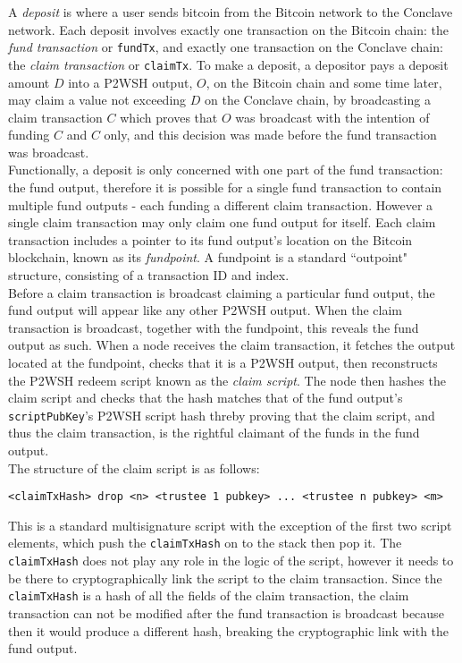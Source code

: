 \documentclass{article}
\begin{document}
A \textit{deposit} is where a user sends bitcoin from the Bitcoin network to the Conclave network. Each deposit involves exactly one transaction on the Bitcoin chain: the \textit{fund transaction} or \texttt{fundTx}, and exactly one transaction on the Conclave chain: the \textit{claim transaction} or \texttt{claimTx}. To make a deposit, a depositor pays a deposit amount $D$ into a P2WSH output, $O$, on the Bitcoin chain and some time later, may claim a value not exceeding $D$ on the Conclave chain, by broadcasting a claim transaction $C$ which proves that $O$ was broadcast with the intention of funding $C$ and $C$ only, and this decision was made before the fund transaction was broadcast. \\
			
			Functionally, a deposit is only concerned with one part of the fund transaction: the fund output, therefore it is possible for a single fund transaction to contain multiple fund outputs - each funding a different claim transaction. However a single claim transaction may only claim one fund output for itself. Each claim transaction includes a pointer to its fund output's location on the Bitcoin blockchain, known as its \textit{fundpoint}. A fundpoint is a standard ``outpoint" structure, consisting of a transaction ID and index. \\
			
			Before a claim transaction is broadcast claiming a particular fund output, the fund output will appear like any other P2WSH output. When the claim transaction is broadcast, together with the fundpoint, this reveals the fund output as such. When a node receives the claim transaction, it fetches the output located at the fundpoint, checks that it is a P2WSH output, then reconstructs the P2WSH redeem script known as the \textit{claim script}. The node then hashes the claim script and checks that the hash matches that of the fund output's \texttt{scriptPubKey}'s P2WSH script hash threby proving that the claim script, and thus the claim transaction, is the rightful claimant of the funds in the fund output. \\
			
			The structure of the claim script is as follows:
			
			\begin{center}
				\texttt{<claimTxHash> drop <n> <trustee 1 pubkey> ... <trustee n pubkey> <m>}
			\end{center}
			
			This is a standard multisignature script with the exception of the first two script elements, which push the \texttt{claimTxHash} on to the stack then pop it. The \texttt{claimTxHash} does not play any role in the logic of the script, however it needs to be there to cryptographically link the script to the claim transaction. Since the \texttt{claimTxHash} is a hash of all the fields of the claim transaction, the claim transaction can not be modified after the fund transaction is broadcast because then it would produce a different hash, breaking the cryptographic link with the fund output. \\
			
\end{document}
